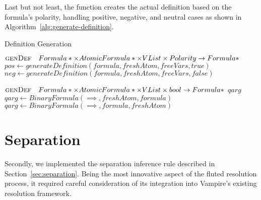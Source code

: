 Last but not least, the  function creates the actual definition based on the formula's polarity, handling positive, negative, and neutral cases as shown in Algorithm~\ref{alg:generate-definition}.

\begin{algorithm}
  \caption{Definition Generation}\label{alg:generate-definition}
  \begin{algorithmic}[1]
      \Statex{}  \(\textsc{genDef}\quad Formula*\times AtomicFormula*\times VList\times Polarity\to Formula*\)
              \State{} 
            \EndCase{}
              \State{} 
            \EndCase{}
              \State{} \(pos \gets generateDefinition(formula,freshAtom,freeVars,true)\)
              \State{} \(neg \gets generateDefinition(formula,freshAtom,freeVars,false)\)
              \State{} 
            \EndCase{}
          \EndSwitch{}
          \State{} 
      \EndFunction{}
  \end{algorithmic}
  \begin{algorithmic}[1]
      \Statex{}  \(\textsc{genDef}\quad Formula*\times AtomicFormula*\times VList\times bool\to Formula*\)
          \State{} \(qarg\)
            \State{} \(qarg \gets BinaryFormula(\implies,freshAtom,formula)\)
          \Else{}
            \State{} \(qarg \gets BinaryFormula(\implies,formula,freshAtom)\)
          \EndIf{}
          \State{} 
      \EndFunction{}
  \end{algorithmic}
\end{algorithm}

\section{Separation}\label{sec:separation-impl}
Secondly, we implemented the separation inference rule described in Section~\ref{sec:separation}.
Being the most innovative aspect of the fluted resolution process, it required careful consideration of its integration into Vampire's existing resolution framework.

